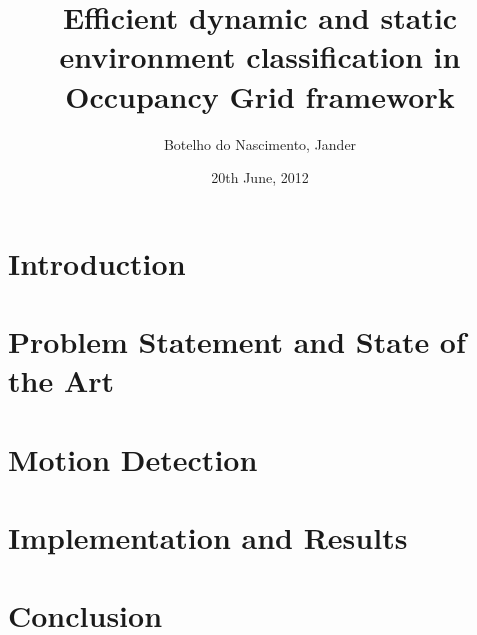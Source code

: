 \documentclass[12pt, a4paper]{memoir} %
\title{Efficient dynamic and static environment classification in Occupancy Grid framework}%
\author{Botelho do Nascimento, Jander}
\date{20th June, 2012} %
\begin{document}
\frontmatter
\begin{titlingpage}
\setcounter{tocdepth}{3}
\maketitle
\end{titlingpage}

\setlength{\parskip}{-1pt plus 1pt}



\cleardoublepage

\tableofcontents* 

\normalsize

\mainmatter
\SingleSpace

\chapter{Introduction} 
	

	
\chapter{Problem Statement and State of the Art}
	


\chapter{Motion Detection}
	


\chapter{Implementation and Results}
	
	

\chapter{Conclusion}
	
	

\backmatter

%

{}
\end{document}
